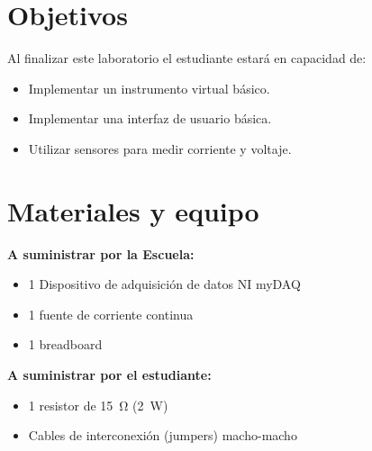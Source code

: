 \documentclass[12pt,letterpaper]{report}
\newcommand{\obj}{Objetivos}
\newcommand{\mat}{Materiales y equipo}
\newcommand{\capacidad}{Al finalizar este laboratorio el estudiante estará en capacidad de:}
\begin{document}
\section{\obj}
\capacidad
\begin{itemize}
\item Implementar un instrumento virtual básico.
\item Implementar una interfaz de usuario básica.
\item Utilizar sensores para medir corriente y voltaje.
\end{itemize}

\section{\mat}
\textbf{A suministrar por la Escuela:}
\begin{itemize}
\item 1 Dispositivo de adquisición de datos NI myDAQ
\item 1 fuente de corriente continua
\item 1 breadboard
\end{itemize}
\textbf{A suministrar por el estudiante:}
\begin{itemize}
\item 1 resistor de \SI{15}{\ohm} (\SI{2}{\watt})
\item Cables de interconexión (jumpers) macho-macho
\end{itemize}
\end{document}
